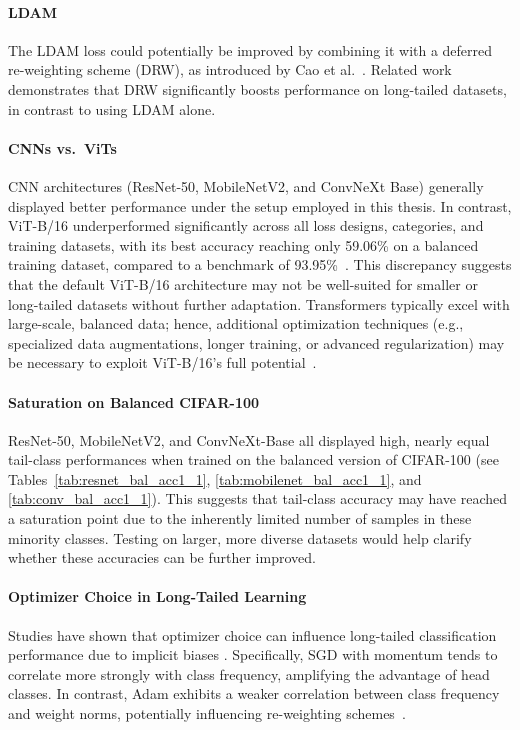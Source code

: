 \paragraph{LDAM}
The LDAM loss could potentially be improved by combining it with a deferred re-weighting scheme (DRW), as introduced by Cao et al.~\cite{cao2019learningimbalanceddatasetslabeldistributionaware}. Related work~\cite{menon2021longtaillearninglogitadjustment} demonstrates that DRW significantly boosts performance on long-tailed datasets, in contrast to using LDAM alone.

\paragraph{CNNs vs.\ ViTs}
CNN architectures (ResNet-50, MobileNetV2, and ConvNeXt Base) generally displayed better performance under the setup employed in this thesis. In contrast, ViT-B/16 underperformed significantly across all loss designs, categories, and training datasets, with its best accuracy reaching only 59.06\% on a balanced training dataset, compared to a benchmark of 93.95\%~\cite{ye2023partialfinetuningsuccessorfinetuning}. This discrepancy suggests that the default ViT-B/16 architecture may not be well-suited for smaller or long-tailed datasets without further adaptation. Transformers typically excel with large-scale, balanced data; hence, additional optimization techniques (e.g., specialized data augmentations, longer training, or advanced regularization) may be necessary to exploit ViT-B/16’s full potential~\cite{menon2021longtaillearninglogitadjustment,loshchilov2018fixing}.

\paragraph{Saturation on Balanced CIFAR-100}
ResNet-50, MobileNetV2, and ConvNeXt-Base all displayed high, nearly equal tail-class performances when trained on the balanced version of CIFAR-100 (see Tables~\ref{tab:resnet_bal_acc1_1}, \ref{tab:mobilenet_bal_acc1_1}, and \ref{tab:conv_bal_acc1_1}). This suggests that tail-class accuracy may have reached a saturation point due to the inherently limited number of samples in these minority classes. Testing on larger, more diverse datasets would help clarify whether these accuracies can be further improved.

\paragraph{Optimizer Choice in Long-Tailed Learning}
Studies have shown that optimizer choice can influence long-tailed classification performance due to implicit biases \cite{soudry2024implicitbias,menon2021longtaillearninglogitadjustment}. Specifically, SGD with momentum tends to correlate more strongly with class frequency, amplifying the advantage of head classes. In contrast, Adam exhibits a weaker correlation between class frequency and weight norms, potentially influencing re-weighting schemes~\cite{menon2021longtaillearninglogitadjustment}.

